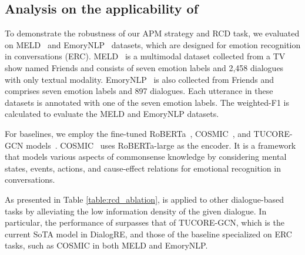 \documentclass[11pt]{article}
\begin{document}
\begin{table}[t]
\centering
{}\caption{Experimental results of  on MELD and EmoryNLP tasks. \label{table:rcd_ablation}}
\end{table} 
\subsection{Analysis on the applicability of }
To demonstrate the robustness of our APM strategy and RCD task, we evaluated  on MELD~\citep{poria-etal-2019-meld} and EmoryNLP~\citep{zahiri2018emotion} datasets, which are designed for emotion recognition in conversations (ERC). 
MELD~\citep{poria-etal-2019-meld} is a multimodal dataset collected from a TV show named Friends and consists of seven emotion labels and 2,458 dialogues with only textual modality. 
EmoryNLP~\citep{zahiri2018emotion} is also collected from Friends and comprises seven emotion labels and 897 dialogues. Each utterance in these datasets is annotated with one of the seven emotion labels. The weighted-F1 is calculated to evaluate the MELD and EmoryNLP datasets.

For baselines, we employ the fine-tuned RoBERTa~\citep{liu2019roberta}, COSMIC~\citep{ghosal-etal-2020-cosmic}, and TUCORE-GCN models~\citep{lee-choi-2021-graph}. 
COSMIC~\citep{ghosal-etal-2020-cosmic} uses RoBERTa-large as the encoder. It is a framework that models various aspects of commonsense knowledge by considering mental states, events, actions, and cause-effect relations for emotional recognition in conversations. 

As presented in Table \ref{table:rcd_ablation},  is applied to other dialogue-based tasks by alleviating the low information density of the given dialogue. In particular, the performance of  surpasses that of TUCORE-GCN, which is the current SoTA model in DialogRE, and those of the baseline specialized on ERC tasks, such as COSMIC in both MELD and EmoryNLP.
\end{document}
